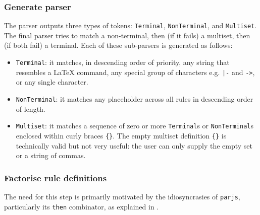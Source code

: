 \subsubsection{Generate parser}
The parser outputs three types of tokens: \lstinline{Terminal}, \lstinline{NonTerminal}, and \lstinline{Multiset}. The final parser tries to match a non-terminal, then (if it fails) a multiset, then (if both fail) a terminal. Each of these sub-parsers is generated as follows:
\begin{itemize}
    \item \lstinline{Terminal}: it matches, in descending order of priority, any string that resembles a \LaTeX{} command, any special group of characters e.g. \lstinline{|-} and \lstinline{->}, or any single character.
    \item \lstinline{NonTerminal}: it matches any placeholder across all rules in descending order of length.
    \item \lstinline{Multiset}: it matches a sequence of zero or more \lstinline{Terminal}s or \lstinline{NonTerminal}s enclosed within curly braces \lstinline|{}|. The empty multiset definition \lstinline|{}| is technically valid but not very useful: the user can only supply the empty set or a string of commas.
\end{itemize}

\subsubsection{Factorise rule definitions}
\label{syntax:factorisation}
The need for this step is primarily motivated by the idiosyncrasies of \lstinline{parjs}, particularly its \lstinline{then} combinator, as explained in . 

